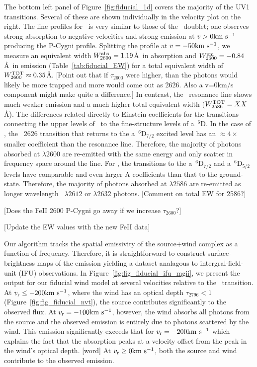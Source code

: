 \documentclass[12pt,preprint]{aastex}
\begin{document}
{The bottom left panel of Figure~\ref{fig:fiducial_1d} covers the
majority of the  UV1 transitions.  Several of these are
shown individually in the velocity plot on the right.  The line
profiles for \feiib\ is very similar to those of the \mgiid\ doublet;
one observes strong absorption to negative velocities and strong
emission at $v > 0 {\rm km~s^{-1}}$ producing the P-Cygni profile.  Splitting
the profile at $v = -50 {\rm km~s^{-1}}$, we measure an equivalent width
$W_{2600}^{\rm abs} = 1.19$\AA\ in absorption and $W_{2600}^{\rm em} =
-0.84$\AA\ in emission (Table~\ref{tab:fiducial_EW}) for a total
equivalent width of $W_{2600}^{\rm TOT} \approx 0.35$\AA.  
[Point out that if $\tau_{2600}$ were higher, than the photons would
likely be more trapped and more would come out as 2626.  Also a
v=0km/s component might make quite a difference.]
In contrast, the \feiia\ resonance line shows much weaker emission and
a much higher total equivalent width ($W_{2586}^{\rm TOT} = XX$\AA).
The differences related directly to Einstein coefficients for the
transitions connecting the upper levels of \feiid\ to the 
fine-structure levels of a~$^6$D.  In the case of \feiib, the
~2626 transition that returns to the a~$^6$D$_{7/2}$
excited level has an $\approx 4\times$ smaller coefficient than the
resonance line.  Therefore, the majority of photons absorbed at
$\lambda 2600$ are re-emitted with the same energy and only scatter 
in frequency space around the line.  For \feiia, the transitions to
the a~$^6$D$_{7/2}$ and a~$^6$D$_{5/2}$ levels have comparable and
even larger A coefficients than that to the ground-state.  Therefore,
the majority of photons absorbed at $\lambda 2586$ are re-emitted 
as longer wavelength ~$\lambda 2612$ or $\lambda 2632$
photons.  [Comment on total EW for 2586?]

[Does the FeII 2600 P-Cygni go away if we increase $\tau_{2600}$?]

[Update the EW values with the new FeII data]


Our algorithm tracks the spatial emissivity of the source+wind
complex as a function of frequency.  Therefore, it is straightforward
to construct surface-brightness maps of the emission yielding a
dataset analagous to intergral-field-unit (IFU) observations.  In
Figure~\ref{fig:fig_fiducial_ifu_mgii}, we present the output for our
fiducial wind model at several velocities relative to the \mgiia\
transition. At $v_{\rm r} \le -200 {\rm km~s^{-1}}$, where the wind has an optical
depth $\tau_{2796} < 1$ (Figure~\ref{fig:fig_fiducial_nvt}),
the source contributes significantly to the observed flux.  
At $v_{\rm r}=-100 {\rm km~s^{-1}}$, however, the
wind absorbs all photons from the source and the observed emission is
entirely due to photons scattered by the wind.  This
emission significantly exceeds that for $v_{\rm r} = -200{\rm km~s^{-1}}$ which
explains the fact that the absorption peaks at a velocity offset from
the peak in the wind's optical depth. [word] At $v_{\rm r} \ge 0
{\rm km~s^{-1}}$,  both the source and wind contribute to the observed emission.

}
\end{document}
